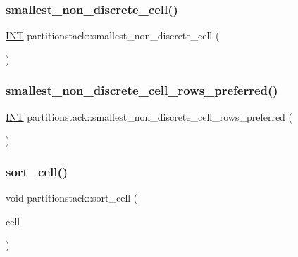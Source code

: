\subsubsection{\texorpdfstring{smallest\+\_\+non\+\_\+discrete\+\_\+cell()}{smallest\_non\_discrete\_cell()}}
{\footnotesize\ttfamily \mbox{\hyperlink{galois_8h_a09fddde158a3a20bd2dcadb609de11dc}{I\+NT}} partitionstack\+::smallest\+\_\+non\+\_\+discrete\+\_\+cell (\begin{DoxyParamCaption}{ }\end{DoxyParamCaption})}

\mbox{\label{classpartitionstack_acfcb868d6da7defb577d16bd5afe8087}} 
\subsubsection{\texorpdfstring{smallest\+\_\+non\+\_\+discrete\+\_\+cell\+\_\+rows\+\_\+preferred()}{smallest\_non\_discrete\_cell\_rows\_preferred()}}
{\footnotesize\ttfamily \mbox{\hyperlink{galois_8h_a09fddde158a3a20bd2dcadb609de11dc}{I\+NT}} partitionstack\+::smallest\+\_\+non\+\_\+discrete\+\_\+cell\+\_\+rows\+\_\+preferred (\begin{DoxyParamCaption}{ }\end{DoxyParamCaption})}

\mbox{\label{classpartitionstack_abb4d78049a6424e54e65a25c7d57dca2}} 
\subsubsection{\texorpdfstring{sort\+\_\+cell()}{sort\_cell()}}
{\footnotesize\ttfamily void partitionstack\+::sort\+\_\+cell (\begin{DoxyParamCaption}\item[{\mbox{\hyperlink{galois_8h_a09fddde158a3a20bd2dcadb609de11dc}{I\+NT}}}]{cell }\end{DoxyParamCaption})}

